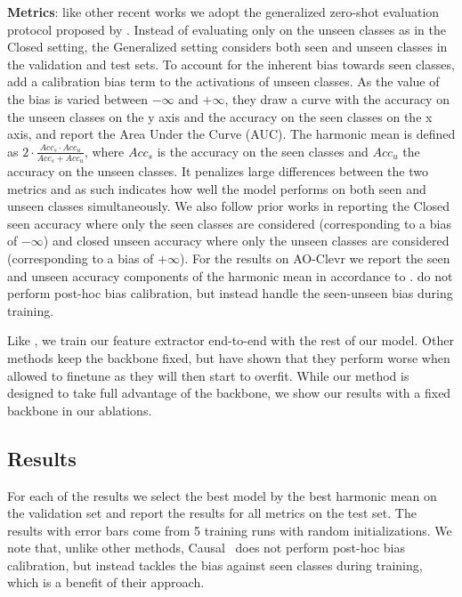 \documentclass{article}
\begin{document}
\textbf{Metrics}: like other recent works we adopt the generalized zero-shot evaluation protocol proposed by \citet{purushwalkam2019task, chao2016empirical}. Instead of evaluating only on the unseen classes as in the Closed setting, the Generalized setting considers both seen and unseen classes in the validation and test sets. To account for the inherent bias towards seen classes,  \citet{chao2016empirical} add a calibration bias term to the activations of unseen classes. As the value of the bias is varied between $-\infty$ and $+\infty$, they draw a curve with the accuracy on the unseen classes on the y axis and the accuracy on the seen classes on the x axis, and report the Area Under the Curve (AUC). The harmonic mean is defined as $2\cdot\frac{Acc_s \cdot Acc_u}{Acc_s + Acc_u}$, where $Acc_s$ is the accuracy on the seen classes and $Acc_u$ the accuracy on the unseen classes. It penalizes large differences between the two metrics and as such indicates how well the model performs on both seen and unseen classes simultaneously. We also follow prior works in reporting the Closed seen accuracy where only the seen classes are considered (corresponding to a bias of $-\infty$) and closed unseen accuracy where only the unseen classes are considered (corresponding to a bias of $+\infty$). For the results on AO-Clevr we report the seen and unseen accuracy components of the harmonic mean in accordance to \citet{atzmon2020causal}. \citet{atzmon2020causal} do not perform post-hoc bias calibration, but instead handle the seen-unseen bias during training.

Like \citet{naeem2021learning}, we train our feature extractor end-to-end with the rest of our model. Other methods keep the backbone fixed, but \citet{naeem2021learning} have shown that they perform worse when allowed to finetune as they will then start to overfit. While our method is designed to take full advantage of the backbone, we show our results with a fixed backbone in our ablations.

\subsection{Results}
For each of the results we select the best model by the best harmonic mean on the validation set and report the results for all metrics on the test set. The results with error bars come from 5 training runs with random initializations. We note that, unlike other methods, Causal~\citep{atzmon2020causal} does not perform post-hoc bias calibration,  but instead tackles the bias against seen classes during training, which is a benefit of their approach.
\end{document}
